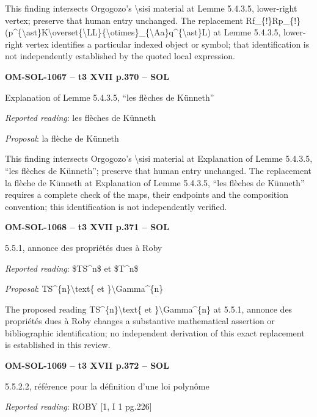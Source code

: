 This finding intersects Orgogozo's \textbackslash{}sisi material at Lemme 5.4.3.5, lower-right vertex; preserve that human entry unchanged. The replacement Rf\_\{!\}Rp\_\{!\}(p\textasciicircum{}\{\textbackslash{}ast\}K\textbackslash{}overset\{\textbackslash{}LL\}\{\textbackslash{}otimes\}\_\{\textbackslash{}Aa\}q\textasciicircum{}\{\textbackslash{}ast\}L) at Lemme 5.4.3.5, lower-right vertex identifies a particular indexed object or symbol; that identification is not independently established by the quoted local expression.\par
\par\noindent\textbf{OM-SOL-1067 -- t3 XVII p.370 -- SOL}\par
Explanation of Lemme 5.4.3.5, “les flèches de Künneth”\par
\emph{Reported reading}: les flèches de Künneth\par
\emph{Proposal}: la flèche de Künneth\par
This finding intersects Orgogozo's \textbackslash{}sisi material at Explanation of Lemme 5.4.3.5, “les flèches de Künneth”; preserve that human entry unchanged. The replacement la flèche de Künneth at Explanation of Lemme 5.4.3.5, “les flèches de Künneth” requires a complete check of the maps, their endpoints and the composition convention; this identification is not independently verified.\par
\par\noindent\textbf{OM-SOL-1068 -- t3 XVII p.371 -- SOL}\par
5.5.1, annonce des propriétés dues à Roby\par
\emph{Reported reading}: \$TS\textasciicircum{}n\$ et \$T\textasciicircum{}n\$\par
\emph{Proposal}: TS\textasciicircum{}\{n\}\textbackslash{}text\{ et \}\textbackslash{}Gamma\textasciicircum{}\{n\}\par
The proposed reading TS\textasciicircum{}\{n\}\textbackslash{}text\{ et \}\textbackslash{}Gamma\textasciicircum{}\{n\} at 5.5.1, annonce des propriétés dues à Roby changes a substantive mathematical assertion or bibliographic identification; no independent derivation of this exact replacement is established in this review.\par
\par\noindent\textbf{OM-SOL-1069 -- t3 XVII p.372 -- SOL}\par
5.5.2.2, référence pour la définition d'une loi polynôme\par
\emph{Reported reading}: ROBY [1, I 1 pg.226]\par
